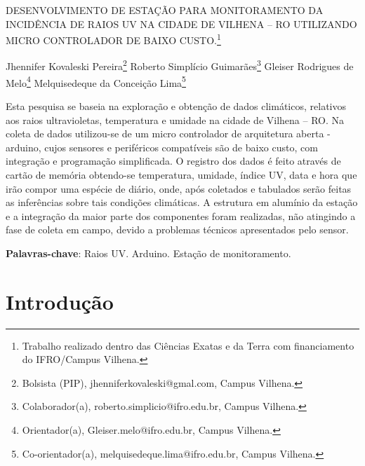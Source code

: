 \documentclass[article,12pt,onesidea,4paper,english,brazil]{abntex2}
\begin{document}
	
	
	\frenchspacing 
	
	\begin{center}
		\LARGE DESENVOLVIMENTO DE ESTAÇÃO PARA MONITORAMENTO DA INCIDÊNCIA DE RAIOS UV NA CIDADE DE VILHENA – RO UTILIZANDO MICRO CONTROLADOR DE BAIXO CUSTO.\footnote{Trabalho realizado dentro das Ciências Exatas e da Terra com financiamento do IFRO/Campus Vilhena.}
		
		\normalsize
		Jhennifer Kovaleski Pereira\footnote{Bolsista (PIP), jhenniferkovaleski@gmal.com, Campus Vilhena.} 
		Roberto Simplício Guimarães\footnote{ Colaborador(a), roberto.simplicio@ifro.edu.br, Campus Vilhena.} 
	Gleiser Rodrigues de Melo\footnote{ Orientador(a), Gleiser.melo@ifro.edu.br, Campus Vilhena.} 
		Melquisedeque da Conceição Lima\footnote{Co-orientador(a), melquisedeque.lima@ifro.edu.br, Campus Vilhena.} 
	\end{center}
	
	\begin{resumoumacoluna}
	Esta pesquisa se baseia na exploração e obtenção de dados climáticos, relativos aos raios ultravioletas, temperatura e umidade na cidade de Vilhena – RO. Na coleta de dados utilizou-se de um micro controlador de arquitetura aberta - arduino, cujos sensores e periféricos compatíveis são de baixo custo, com integração e programação simplificada. O registro dos dados é feito através de cartão de memória obtendo-se temperatura, umidade, índice UV, data e hora que irão compor uma espécie de diário, onde, após coletados e tabulados serão feitas as inferências sobre tais condições climáticas. A estrutura em alumínio da estação e a integração da maior parte dos componentes foram realizadas, não atingindo a fase de coleta em campo, devido a problemas técnicos apresentados pelo sensor.	
		
		\vspace{\onelineskip}
		
		\noindent
		\textbf{Palavras-chave}: Raios UV. Arduino. Estação de monitoramento.
	\end{resumoumacoluna}
	
	\section*{Introdução}
	
\end{document}
